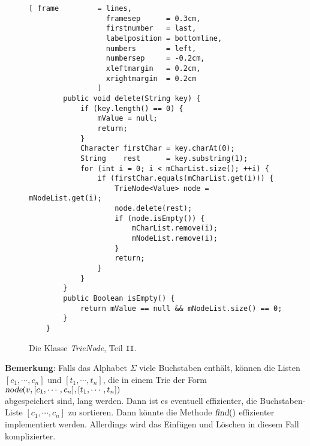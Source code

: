 \begin{figure}[!ht]
  \centering
\begin{Verbatim}[ frame         = lines, 
                  framesep      = 0.3cm, 
                  firstnumber   = last,
                  labelposition = bottomline,
                  numbers       = left,
                  numbersep     = -0.2cm,
                  xleftmargin   = 0.2cm,
                  xrightmargin  = 0.2cm
                ]
        public void delete(String key) {
            if (key.length() == 0) {
                mValue = null;
                return;
            } 
            Character firstChar = key.charAt(0);
            String    rest      = key.substring(1);
            for (int i = 0; i < mCharList.size(); ++i) {
                if (firstChar.equals(mCharList.get(i))) {
                    TrieNode<Value> node = mNodeList.get(i);
                    node.delete(rest);
                    if (node.isEmpty()) {
                        mCharList.remove(i);
                        mNodeList.remove(i);
                    } 
                    return;
                }
            }
        }
        public Boolean isEmpty() {
            return mValue == null && mNodeList.size() == 0;
        }
    }
\end{Verbatim}
\vspace*{-0.3cm}
  \caption{Die Klasse \textsl{TrieNode}, Teil \texttt{II}.}
  \label{fig:TrieNode-II}
\end{figure}

\noindent
\textbf{Bemerkung}:  Falls das Alphabet $\Sigma$ viele Buchstaben enth\"alt, 
k\"onnen die Listen $[c_1, \cdots, c_n]$ und $[t_1,\cdots,t_n]$, die in einem Trie  der Form
\\[0.2cm]
\hspace*{1.3cm}
$\textsl{node}(v, [c_1, \cdots, c_n], [t_1,\cdots,t_n])$
\\[0.2cm]
abgespeichert sind, lang werden.  Dann ist es eventuell effizienter, die Buchstaben-Liste
$[c_1, \cdots, c_n]$ zu sortieren.  Dann k\"onnte die Methode $\textsl{find}()$
effizienter implementiert werden.  Allerdings wird das Einf\"ugen und L\"oschen in diesem Fall komplizierter.
\vspace*{0.3cm}


